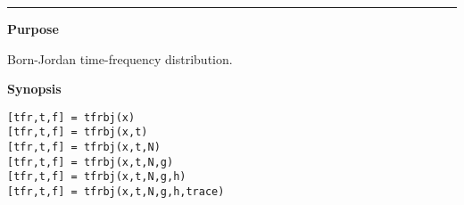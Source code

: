 

\hspace*{-1.6cm}{\Large \bf tfrbj}

\vspace*{-.4cm}
\hspace*{-1.6cm}\rule[0in]{16.5cm}{.02cm}
\vspace*{.2cm}

{\bf \large {}\selectfont Purpose}\\
\hspace*{1.5cm}
\begin{minipage}[t]{13.5cm}
Born-Jordan time-frequency distribution.
\end{minipage}
\vspace*{.3cm}

{\bf \large {}\selectfont Synopsis}\\
\hspace*{1.5cm}
\begin{minipage}[t]{13.5cm}
\begin{verbatim}
[tfr,t,f] = tfrbj(x)
[tfr,t,f] = tfrbj(x,t)
[tfr,t,f] = tfrbj(x,t,N)
[tfr,t,f] = tfrbj(x,t,N,g)
[tfr,t,f] = tfrbj(x,t,N,g,h)
[tfr,t,f] = tfrbj(x,t,N,g,h,trace)
\end{verbatim}
\end{minipage}
\vspace*{.5cm}

